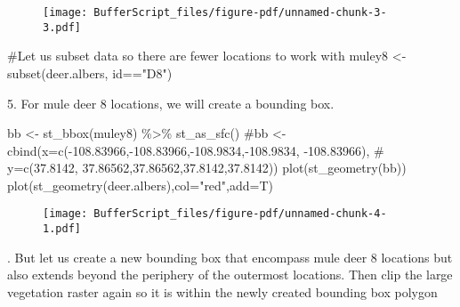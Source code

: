 \documentclass[
  letterpaper,
]{book}
\newenvironment{Shaded}{\begin{snugshade}}{\end{snugshade}}
\newcommand{\AttributeTok}[1]{\textcolor[rgb]{0.40,0.45,0.13}{#1}}
\newcommand{\CommentTok}[1]{\textcolor[rgb]{0.37,0.37,0.37}{#1}}
\newcommand{\FunctionTok}[1]{\textcolor[rgb]{0.28,0.35,0.67}{#1}}
\newcommand{\NormalTok}[1]{\textcolor[rgb]{0.00,0.23,0.31}{#1}}
\newcommand{\OtherTok}[1]{\textcolor[rgb]{0.00,0.23,0.31}{#1}}
\newcommand{\SpecialCharTok}[1]{\textcolor[rgb]{0.37,0.37,0.37}{#1}}
\newcommand{\StringTok}[1]{\textcolor[rgb]{0.13,0.47,0.30}{#1}}
\begin{document}
\begin{figure}[H]

{\centering \texttt{[image: BufferScript\_files/figure-pdf/unnamed-chunk-3-3.pdf]}

}

\end{figure}

\begin{Shaded}
\begin{Highlighting}[]
\CommentTok{\#Let us subset data so there are fewer locations to work with}
\NormalTok{muley8 }\OtherTok{\textless{}{-}} \FunctionTok{subset}\NormalTok{(deer.albers, id}\SpecialCharTok{==}\StringTok{"D8"}\NormalTok{)}
\end{Highlighting}
\end{Shaded}

5. For mule deer 8 locations, we will create a bounding box.

\begin{Shaded}
\begin{Highlighting}[]
\NormalTok{bb }\OtherTok{\textless{}{-}} \FunctionTok{st\_bbox}\NormalTok{(muley8) }\SpecialCharTok{\%\textgreater{}\%} \FunctionTok{st\_as\_sfc}\NormalTok{()}
\CommentTok{\#bb \textless{}{-} cbind(x=c({-}108.83966,{-}108.83966,{-}108.9834,{-}108.9834, {-}108.83966), }
\CommentTok{\#  y=c(37.8142, 37.86562,37.86562,37.8142,37.8142))}
\FunctionTok{plot}\NormalTok{(}\FunctionTok{st\_geometry}\NormalTok{(bb))}
\FunctionTok{plot}\NormalTok{(}\FunctionTok{st\_geometry}\NormalTok{(deer.albers),}\AttributeTok{col=}\StringTok{"red"}\NormalTok{,}\AttributeTok{add=}\NormalTok{T)}
\end{Highlighting}
\end{Shaded}

\begin{figure}[H]

{\centering \texttt{[image: BufferScript\_files/figure-pdf/unnamed-chunk-4-1.pdf]}

}

\end{figure}

. But let us create a new bounding box that encompass mule deer 8
locations but also extends beyond the periphery of the outermost
locations. Then clip the large vegetation raster again so it is within
the newly created bounding box polygon
\end{document}
